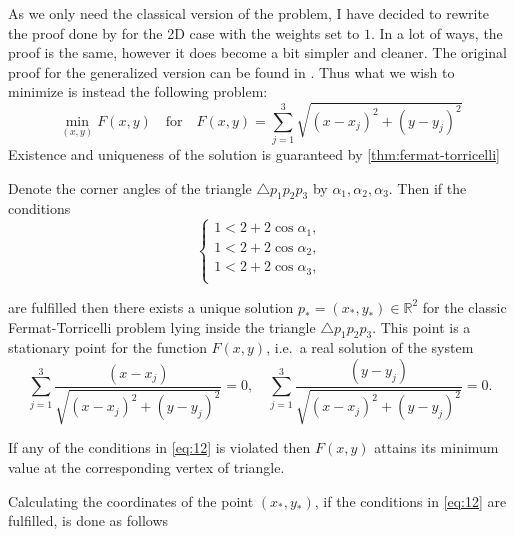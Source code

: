 As we only need the classical version of the problem, I have decided to rewrite
the proof done by \textcite{uteshev2014} for the 2D case with the weights set to
$1$. In a lot of ways, the proof is the same, however it does become a bit
simpler and cleaner. The original proof for the generalized version can be found
in \textcite{uteshev2014}. Thus what we wish to minimize is instead the
following problem:
%
\begin{equation}
  \min_{(x,y)} F(x,y) \quad \text{for} \quad F(x,y) = \sum_{j=1}^3
  \sqrt{{(x-x_j)}^2 + {(y-y_j)}^2}
\end{equation}
%
Existence and uniqueness of the solution is guaranteed by
\cref{thm:fermat-torricelli}
%
\begin{theorem}
\label{thm:fermat-torricelli}
  Denote the corner angles of the triangle $\triangle p_1 p_2 p_3$ by $\alpha_1, \alpha_2,
  \alpha_3$. Then if the conditions
  \begin{equation}
    \label{eq:12}
    \left\{
      \begin{array}{c}
        1 < 2 + 2 \cos \alpha_1 , \\
        1 < 2 + 2 \cos \alpha_2 , \\
        1 < 2 + 2 \cos \alpha_3 , \\
      \end{array}
    \right.
  \end{equation}


  are fulfilled then there exists a unique solution $p_\ast = (x_\ast, y_\ast)
  \in \mathbb{R}^2$ for the classic Fermat-Torricelli problem lying inside
  the triangle $\triangle p_1 p_2 p_3$. This point is a stationary point for the function
  $F(x,y)$, i.e.\ a real solution of the system
  \begin{equation}
    \label{eq:13}
    \sum_{j=1}^3 \frac{(x-x_j)}{\sqrt{{(x-x_j)}^2 + {(y - y_j)}^2}} = 0, \quad
    \sum_{j=1}^3 \frac{(y-y_j)}{\sqrt{{(x-x_j)}^2 + {(y - y_j)}^2}} = 0.
  \end{equation}


  If any of the conditions in \cref{eq:12} is violated then $F(x,y)$ attains its
  minimum value at the corresponding vertex of triangle.
\end{theorem}
%
Calculating the coordinates of the point $(x_\ast, y_\ast)$, if the conditions
in \cref{eq:12} are fulfilled, is done as follows
